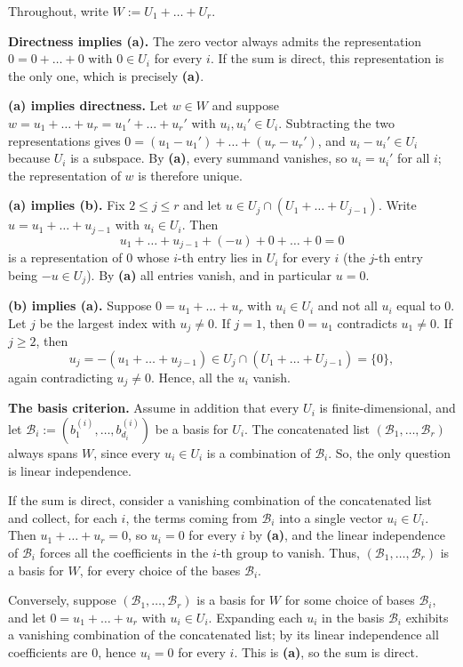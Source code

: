 \begin{exercisesolution}
\label{sol:direct_sum_conditions}
  Throughout, write $W := U_1 + \dots + U_r$.

  \textbf{Directness implies (a).} The zero vector always admits the representation $0 = 0 + \dots + 0$ with $0 \in U_i$ for every $i$. If the sum is direct, this representation is the only one, which is precisely \textbf{(a)}.

  \textbf{(a) implies directness.} Let $w \in W$ and suppose $w = u_1 + \dots + u_r = u_1' + \dots + u_r'$ with $u_i, u_i' \in U_i$. Subtracting the two representations gives $0 = (u_1 - u_1') + \dots + (u_r - u_r')$, and $u_i - u_i' \in U_i$ because $U_i$ is a subspace. By \textbf{(a)}, every summand vanishes, so $u_i = u_i'$ for all $i$; the representation of $w$ is therefore unique.

  \textbf{(a) implies (b).} Fix $2 \le j \le r$ and let $u \in U_j \cap (U_1 + \dots + U_{j-1})$. Write $u = u_1 + \dots + u_{j-1}$ with $u_i \in U_i$. Then
  \[ u_1 + \dots + u_{j-1} + (-u) + 0 + \dots + 0 = 0 \]
  is a representation of $0$ whose $i$-th entry lies in $U_i$ for every $i$ (the $j$-th entry being $-u \in U_j$). By \textbf{(a)} all entries vanish, and in particular $u = 0$.

  \textbf{(b) implies (a).} Suppose $0 = u_1 + \dots + u_r$ with $u_i \in U_i$ and not all $u_i$ equal to $0$. Let $j$ be the largest index with $u_j \ne 0$. If $j = 1$, then $0 = u_1$ contradicts $u_1 \ne 0$. If $j \ge 2$, then
  \[ u_j = -(u_1 + \dots + u_{j-1}) \in U_j \cap (U_1 + \dots + U_{j-1}) = \{0\}, \]
  again contradicting $u_j \ne 0$. Hence, all the $u_i$ vanish.

  \textbf{The basis criterion.} Assume in addition that every $U_i$ is finite-di\-men\-sional, and let $\mathcal{B}_i := (b_1^{(i)}, \dots, b_{d_i}^{(i)})$ be a basis for $U_i$. The concatenated list $(\mathcal{B}_1, \dots, \mathcal{B}_r)$ always spans $W$, since every $u_i \in U_i$ is a combination of $\mathcal{B}_i$. So, the only question is linear independence.

  If the sum is direct, consider a vanishing combination of the concatenated list and collect, for each $i$, the terms coming from $\mathcal{B}_i$ into a single vector $u_i \in U_i$. Then $u_1 + \dots + u_r = 0$, so $u_i = 0$ for every $i$ by \textbf{(a)}, and the linear independence of $\mathcal{B}_i$ forces all the coefficients in the $i$-th group to vanish. Thus, $(\mathcal{B}_1, \dots, \mathcal{B}_r)$ is a basis for $W$, for every choice of the bases $\mathcal{B}_i$.

  Conversely, suppose $(\mathcal{B}_1, \dots, \mathcal{B}_r)$ is a basis for $W$ for some choice of bases $\mathcal{B}_i$, and let $0 = u_1 + \dots + u_r$ with $u_i \in U_i$. Expanding each $u_i$ in the basis $\mathcal{B}_i$ exhibits a vanishing combination of the concatenated list; by its linear independence all coefficients are $0$, hence $u_i = 0$ for every $i$. This is \textbf{(a)}, so the sum is direct.
\end{exercisesolution}

